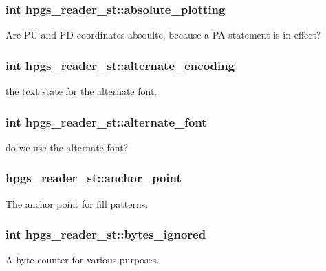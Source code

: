 \subsubsection[{absolute\_\-plotting}]{\setlength{\rightskip}{0pt plus 5cm}int {\bf hpgs\_\-reader\_\-st::absolute\_\-plotting}}\label{structhpgs__reader__st_a04d6a37e1e9b04a801fb9b6e55663f8c}
Are PU and PD coordinates absoulte, because a PA statement is in effect? 
\subsubsection[{alternate\_\-encoding}]{\setlength{\rightskip}{0pt plus 5cm}int {\bf hpgs\_\-reader\_\-st::alternate\_\-encoding}}\label{structhpgs__reader__st_ac07b5535afdff4cf8301da1effa4bbc5}
the text state for the alternate font. 
\subsubsection[{alternate\_\-font}]{\setlength{\rightskip}{0pt plus 5cm}int {\bf hpgs\_\-reader\_\-st::alternate\_\-font}}\label{structhpgs__reader__st_ae150f3881d0c8d20a7b46e866e032f44}
do we use the alternate font? 
\subsubsection[{anchor\_\-point}]{ {\bf hpgs\_\-reader\_\-st::anchor\_\-point}}\label{structhpgs__reader__st_a4f626593ae810ddef48b04c7163df796}
The anchor point for fill patterns. 
\subsubsection[{bytes\_\-ignored}]{\setlength{\rightskip}{0pt plus 5cm}int {\bf hpgs\_\-reader\_\-st::bytes\_\-ignored}}\label{structhpgs__reader__st_a224d05ab1b2d4f53c5c623221c439031}
A byte counter for various purposes. 

